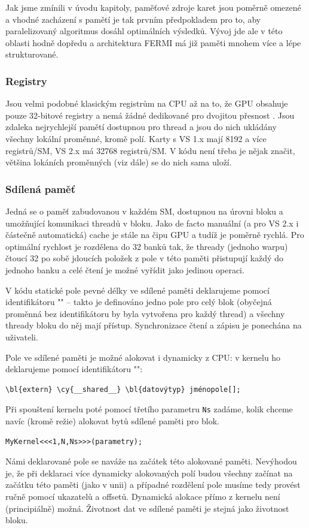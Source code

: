     Jak jsme zmínili v úvodu kapitoly, paměťové zdroje karet jsou poměrně omezené a vhodné zacházení s pamětí je tak prvním předpokladem pro to, aby paralelizovaný algoritmus dosáhl optimálních výsledků. Vývoj jde ale v této oblasti hodně dopředu a architektura FERMI má již paměti mnohem více a lépe strukturované.

    \subsubsection{Registry}

    Jsou velmi podobné klasickým registrům na CPU až na to, že GPU obsahuje pouze 32-bitové registry a nemá žádné dedikované pro dvojitou přesnost . Jsou zdaleka nejrychlejší pamětí dostupnou pro thread a jsou do nich ukládány všechny lokální proměnné, kromě polí. Karty s VS 1.x mají 8192 a více registrů/SM, VS 2.x má 32768 registrů/SM. V kódu není třeba je nějak značit, většina lokáních proměnných (viz dále) se do nich sama uloží.

    \subsubsection{Sdílená paměť}

    Jedná se o paměť zabudovanou v každém SM, dostupnou na úrovni bloku a umožňující komunikaci threadů v bloku. Jako de facto manuální (a pro VS 2.x i částečně automatická) cache je stále na čipu GPU a tudíž je poměrně rychlá. Pro optimální rychlost je rozdělena do 32 banků tak, že thready (jednoho warpu) čtoucí 32 po sobě jdoucích položek z pole v této paměti přistupují každý do jednoho banku a celé čtení je možné vyřídit jako jedinou operaci.

    V kódu statické pole pevné délky ve sdílené paměti deklarujeme pomocí identifikátoru \Vr"" -- takto je definováno jedno pole pro celý blok (obyčejná proměnná bez identifikátoru by byla vytvořena pro každý thread) a všechny thready bloku do něj mají přístup. Synchronizace čtení a zápisu je ponechána na uživateli.

    Pole ve sdílené paměti je možné alokovat i dynamicky z CPU: v kernelu ho deklarujeme pomocí identifikátoru \Vr"":
    \begin{Verbatim}[commandchars = \\\{\}]
\bl{extern} \cy{__shared__} \bl{datovýtyp} jménopole[];
    \end{Verbatim}
    Při spouštení kernelu poté pomocí třetího parametru {\tt Ns} zadáme, kolik chceme navíc (kromě režie) alokovat bytů sdílené paměti pro blok.
    \begin{Verbatim}[commandchars = \\\{\}]
MyKernel<<<1,N,Ns>>>(parametry);
    \end{Verbatim}
    Námi deklarované pole se naváže na začátek této alokované paměti. Nevýhodou je, že při deklaraci více dynamicky alokovaných polí budou všechny začínat na začátku této paměti (jako v unii) a případné rozdělení pole musíme tedy provést ručně pomocí ukazatelů a offsetů. Dynamická alokace přímo z kernelu není (principiálně) možná. Životnost dat ve sdílené paměti je stejná jako životnost bloku.


